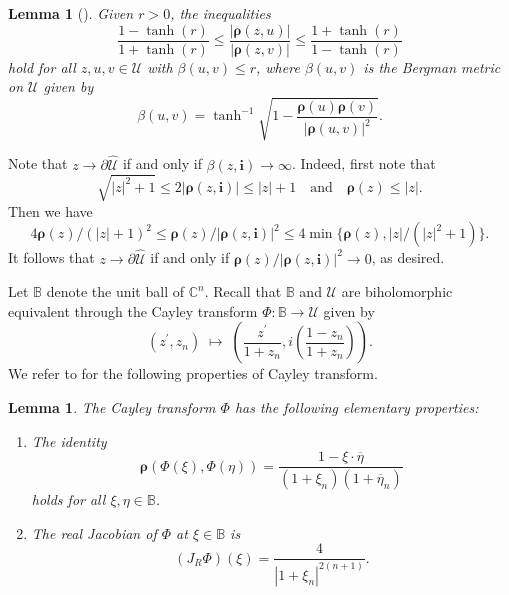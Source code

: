 \documentclass{amsart}
\newtheorem{lemma}[theorem]{Lemma}
\numberwithin{equation}{section}
\newcommand{\ball}{\mathbb{B}}
\newcommand{\calU}{\mathcal{U}}
\newcommand{\bfi}{\mathbf{i}}
\newcommand{\bfrho}{\boldsymbol{\rho}}
\newcommand{\bbB}{\mathbb{B}}
\newcommand{\bbC}{\mathbb{C}}
\begin{document}
\begin{lemma}[{\cite[Lemma 2.7]{LS20}}]\label{blem}
Given $r > 0$, the inequalities
\begin{equation}\label{eqn:eqvltquan}
\frac {1-\tanh (r)}{1+ \tanh (r)} \leq \frac{|\bfrho(z,u)|}{|\bfrho(z,v)|}
\leq \frac {1+\tanh (r)}{1-\tanh (r)}
\end{equation}
hold for all $z,u,v\in \calU$ with $\beta(u,v)\leq r$, where $\beta(u,v)$ is the Bergman metric on $\calU$ given by 
\begin{equation*}\label{eqn:hyperdist}
 \beta(u,v)=\tanh^{-1}\sqrt{1-\frac{\bfrho(u)\bfrho(v)}{|\bfrho(u,v)|^2}}.
\end{equation*}
\end{lemma}

Note that $z\to \partial\widehat{\calU}$ if and only if $\beta(z,\bfi)\to\infty$.
Indeed, first note that 
\begin{equation}\label{eqn:rho(z,i)}
\sqrt{|z|^2+1}\leq2|\bfrho(z,\bfi)|\leq |z|+1\quad \text{and} \quad \bfrho(z)\leq |z|.
\end{equation}
Then we have
\[
4\bfrho(z)/(|z|+1)^2 \leq \bfrho(z)/|\bfrho(z,\bfi)|^2 \leq 4\min\{\bfrho(z), |z|/(|z|^2+1) \}.
\]
It follows that $z\to \partial\widehat{\calU}$ if and only if $\bfrho(z)/|\bfrho(z,\bfi)|^2\to 0$, as desired.

Let $\bbB$ denote the unit ball of $\bbC^n$. Recall that $\bbB$ and $\calU$ are biholomorphic equivalent through the Cayley transform $\Phi:\bbB \to \calU$  given by
\[
(z^{\prime}, z_{n})\; \longmapsto\; \left( \frac {z^{\prime}}{1+z_{n}},
i\left(\frac {1-z_{n}}{1+z_{n}}\right) \right).
\]
We refer to  \cite[Chapter XII]{Ste93} for the following properties of Cayley transform.

\begin{lemma}\label{lem:cayley}
The Cayley transform $\Phi$ has the following elementary properties:
\begin{enumerate}
\item[(i)]
The identity
\begin{equation*}\label{eqn:identity14phi}
\bfrho(\Phi(\xi),\Phi(\eta)) = \frac {1-\xi\cdot \overline{\eta}} {(1+\xi_{n}) (1+\overline{\eta}_{n})}
\end{equation*}
holds for all $\xi,\eta\in \ball$.
\item[(ii)]
The real Jacobian of $\Phi$ at $\xi\in \ball$ is
\begin{equation*}\label{eqn:jacobian4phi}
\left(J_{R}\Phi\right)(\xi) = \frac {4}{|1+\xi_{n}|^{2(n+1)}}.
\end{equation*}
\end{enumerate}
\end{lemma}
\end{document}
